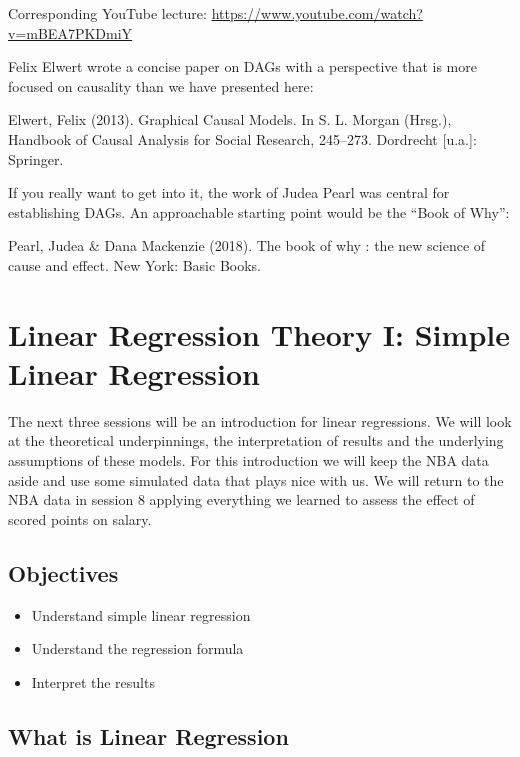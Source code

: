 \documentclass[
]{book}
\providecommand{\tightlist}{%
  \setlength{\itemsep}{0pt}\setlength{\parskip}{0pt}}
\begin{document}
Corresponding YouTube lecture: \url{https://www.youtube.com/watch?v=mBEA7PKDmiY}

Felix Elwert wrote a concise paper on DAGs with a perspective that is more
focused on causality than we have presented here:

Elwert, Felix (2013). Graphical Causal Models. In S. L. Morgan (Hrsg.), Handbook
of Causal Analysis for Social Research, 245--273. Dordrecht {[}u.a.{]}: Springer.

If you really want to get into it, the work of Judea Pearl was central for
establishing DAGs. An approachable starting point would be the ``Book of Why'':

Pearl, Judea \& Dana Mackenzie (2018). The book of why : the new science of cause
and effect. New York: Basic Books.

\hypertarget{lin-t-1}{%
\chapter{Linear Regression Theory I: Simple Linear Regression}\label{lin-t-1}}

The next three sessions will be an introduction for linear regressions.
We will look at the theoretical underpinnings, the interpretation of results
and the underlying assumptions of these models. For this introduction we will
keep the NBA data aside and use some simulated data that plays nice with us.
We will return to the NBA data in session 8 applying everything we
learned to assess the effect of scored points on salary.

\hypertarget{objectives-3}{%
\section{Objectives}\label{objectives-3}}

\begin{itemize}
\tightlist
\item
  Understand simple linear regression
\item
  Understand the regression formula
\item
  Interpret the results
\end{itemize}

\hypertarget{what-is-linear-regression}{%
\section{What is Linear Regression}\label{what-is-linear-regression}}
\end{document}
